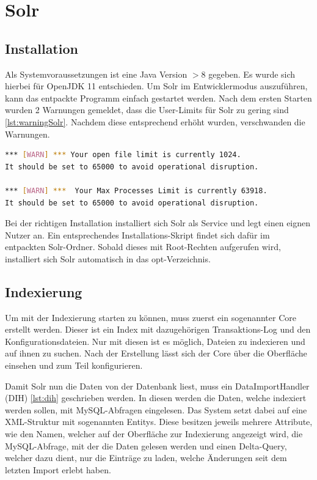 
\section{Solr}

\subsection{Installation}

Als Systemvoraussetzungen ist eine Java Version $> 8$ gegeben. Es wurde sich hierbei für OpenJDK 11 entschieden. Um Solr im Entwicklermodus auszuführen, kann das entpackte Programm einfach gestartet werden. 
Nach dem ersten Starten wurden 2 Warnungen gemeldet, dass die User-Limits für Solr zu gering sind \ref{lst:warningSolr}. Nachdem diese entsprechend erhöht wurden, verschwanden die Warnungen.

\begin{lstlisting}[language=bash, frame=single, label={lst:warningSolr},  caption=Warnungen von Solr zu den User-Limits,captionpos=b] 
*** [WARN] *** Your open file limit is currently 1024.
It should be set to 65000 to avoid operational disruption.

*** [WARN] ***  Your Max Processes Limit is currently 63918.
It should be set to 65000 to avoid operational disruption.
\end{lstlisting}

Bei der richtigen Installation installiert sich Solr als Service und legt einen eignen Nutzer an. Ein entsprechendes Installations-Skript findet sich dafür im entpackten Solr-Ordner. Sobald dieses mit Root-Rechten aufgerufen wird, installiert sich Solr automatisch in das opt-Verzeichnis.

\subsection{Indexierung}

Um mit der Indexierung starten zu können, muss zuerst ein sogenannter Core erstellt werden. Dieser ist ein Index mit dazugehörigen Transaktions-Log und den Konfigurationsdateien. Nur mit diesen ist es möglich, Dateien zu indexieren und auf ihnen zu suchen. Nach der Erstellung lässt sich der Core über die Oberfläche einsehen und zum Teil konfigurieren.

Damit Solr nun die Daten von der Datenbank liest, muss ein DataImportHandler (DIH) \ref{lst:dih} geschrieben werden. In diesen werden die Daten, welche indexiert werden sollen, mit MySQL-Abfragen eingelesen. Das System setzt dabei auf eine XML-Struktur mit sogenannten Entitys. Diese besitzen jeweils mehrere Attribute, wie den Namen, welcher auf der Oberfläche zur Indexierung angezeigt wird, die MySQL-Abfrage, mit der die Daten gelesen werden und einen Delta-Query, welcher dazu dient, nur die Einträge zu laden, welche Änderungen seit dem letzten Import erlebt haben. 

